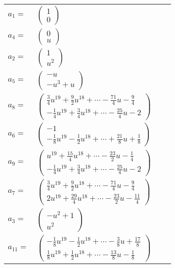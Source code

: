 \documentclass[1p]{elsarticle_modified}
\theoremstyle{definition}
\begin{document}
\begin{tabular}{m{7pt} m{180pt} m{7pt} m{180pt} }
\flushright $a_{1}=$&$\begin{pmatrix}1\\0\end{pmatrix}$ \\
\flushright $a_{4}=$&$\begin{pmatrix}0\\u\end{pmatrix}$ \\
\flushright $a_{2}=$&$\begin{pmatrix}1\\u^2\end{pmatrix}$ \\
\flushright $a_{5}=$&$\begin{pmatrix}- u\\- u^3+u\end{pmatrix}$ \\
\flushright $a_{8}=$&$\begin{pmatrix}\frac{3}{4} u^{19}+\frac{9}{2} u^{18}+\cdots-\frac{71}{4} u-\frac{9}{4}\\-\frac{1}{4} u^{19}+\frac{3}{4} u^{18}+\cdots-\frac{25}{4} u-2\end{pmatrix}$ \\
\flushright $a_{6}=$&$\begin{pmatrix}-1\\-\frac{1}{8} u^{19}-\frac{1}{2} u^{18}+\cdots+\frac{21}{8} u+\frac{1}{8}\end{pmatrix}$ \\
\flushright $a_{9}=$&$\begin{pmatrix}u^{19}+\frac{15}{4} u^{18}+\cdots-\frac{23}{2} u-\frac{1}{4}\\-\frac{1}{4} u^{19}+\frac{3}{4} u^{18}+\cdots-\frac{25}{4} u-2\end{pmatrix}$ \\
\flushright $a_{7}=$&$\begin{pmatrix}\frac{3}{4} u^{19}+\frac{9}{2} u^{18}+\cdots-\frac{71}{4} u-\frac{9}{4}\\2 u^{19}+\frac{29}{4} u^{18}+\cdots-\frac{23}{2} u-\frac{11}{4}\end{pmatrix}$ \\
\flushright $a_{3}=$&$\begin{pmatrix}- u^2+1\\u^2\end{pmatrix}$ \\
\flushright $a_{11}=$&$\begin{pmatrix}-\frac{1}{8} u^{19}-\frac{1}{2} u^{18}+\cdots-\frac{3}{8} u+\frac{17}{8}\\\frac{1}{8} u^{19}+\frac{1}{2} u^{18}+\cdots-\frac{13}{8} u-\frac{1}{8}\end{pmatrix}$ \\

\end{tabular}
\end{document}
